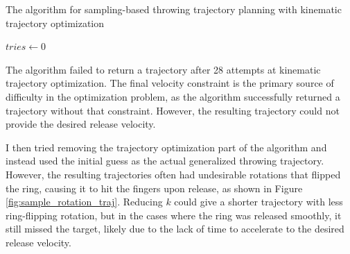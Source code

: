\documentclass[conference]{IEEEtran}
\begin{document}
\begin{algorithm}
\caption{The algorithm for sampling-based throwing trajectory planning with kinematic trajectory optimization}\label{alg:sample_opt}
$tries \gets 0$\;
\end{algorithm}

The algorithm failed to return a trajectory after 28 attempts at kinematic trajectory optimization. The final velocity constraint is the primary source of difficulty in the optimization problem, as the algorithm successfully returned a trajectory without that constraint. However, the resulting trajectory could not provide the desired release velocity.

I then tried removing the trajectory optimization part of the algorithm and instead used the initial guess as the actual generalized throwing trajectory. However, the resulting trajectories often had undesirable rotations that flipped the ring, causing it to hit the fingers upon release, as shown in Figure \ref{fig:sample_rotation_traj}. Reducing $k$ could give a shorter trajectory with less ring-flipping rotation, but in the cases where the ring was released smoothly, it still missed the target, likely due to the lack of time to accelerate to the desired release velocity.
\end{document}
